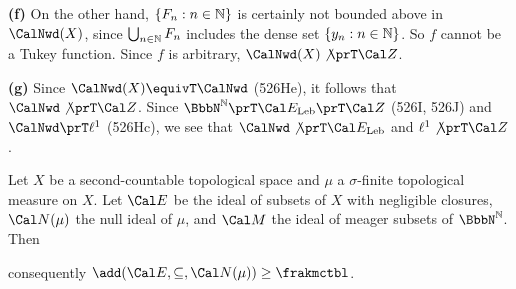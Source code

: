 {\medskip

{\bf (f)}
On the other hand, $\{F_n:n\in\Bbb N\}$ is certainly not bounded above in
$\CalNwd(X)$, since $\bigcup_{n\in\Bbb N}F_n$ includes the dense set
$\{y_n:n\in\Bbb N\}$.   So $f$ cannot be a Tukey function.
Since $f$ is arbitrary, $\CalNwd(X)\not\prT\Cal Z$.

\medskip

{\bf (g)} Since $\CalNwd(X)\equivT\CalNwd$ (526He), it follows that
$\CalNwd\not\prT\Cal Z$.
Since $\NN\prT\Cal E_{\text{Leb}}\penalty-100\prT\Cal Z$ (526I, 526J)
and $\CalNwd\prT\ell^1$ (526Hc),
we see that
$\CalNwd\not\prT\Cal E_{\text{Leb}}$ and
$\ell^1\not\prT\Cal Z$.
}%


 Let $X$ be a second-countable topological
space and $\mu$ a $\sigma$-finite topological measure on $X$.
Let $\Cal E$ be the ideal of subsets of $X$ with negligible closures,
$\Cal N(\mu)$ the null ideal of $\mu$, and $\Cal M$ the ideal of
meager subsets of $\NN$.   Then


\noindent consequently $\add(\Cal E,\subseteq,\Cal N(\mu))\ge\frakmctbl$.

